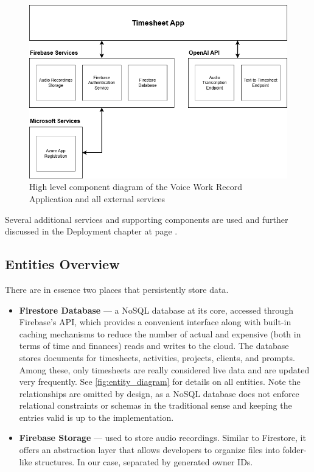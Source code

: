 \documentclass[
  digital,     %
  oneside,     %
  nosansbold,  %
  nocolorbold, %
  lof,         %
  lot,         %
]{fithesis4}
\begin{document}
\begin{figure}[ht]
    \centering
    \includegraphics[width=\textwidth]{assets/diagrams/timesheet_app_component_diagram.drawio.png}
    \caption{High level component diagram of the Voice Work Record Application and all external services}
    \label{fig:timesheet_app_architecture}
\end{figure}

Several additional services and supporting components are used and further discussed in the Deployment chapter at page \pageref{chap:deployment}.

\subsection{Entities Overview}

There are in essence two places that persistently store data.

\begin{itemize}
    \item \textbf{Firestore Database} — a NoSQL database at its core, accessed through Firebase’s API, which provides a convenient interface along with built-in caching mechanisms to reduce the number of actual and expensive (both in terms of time and finances) reads and writes to the cloud. The database stores documents for timesheets, activities, projects, clients, and prompts. Among these, only timesheets are really considered live data and are updated very frequently. See \ref{fig:entity_diagram} for details on all entities. Note the relationships are omitted by design, as a NoSQL database does not enforce relational constraints or schemas in the traditional sense and keeping the entries valid is up to the implementation.
    
    \item \textbf{Firebase Storage} — used to store audio recordings. Similar to Firestore, it offers an abstraction layer that allows developers to organize files into folder-like structures. In our case, separated by generated owner IDs.
\end{itemize}
\end{document}
